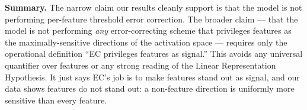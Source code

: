 \documentclass[11pt]{article}
\begin{document}
\medskip
\noindent\textbf{Summary.} The narrow claim our results cleanly support is that the model is not performing per-feature threshold error correction. The broader claim --- that the model is not performing \emph{any} error-correcting scheme that privileges features as the maximally-sensitive directions of the activation space --- requires only the operational definition ``EC privileges features as signal.'' This avoids any universal quantifier over features or any strong reading of the Linear Representation Hypothesis. It just says EC's job is to make features stand out as signal, and our data shows features do not stand out: a non-feature direction is uniformly more sensitive than every feature.
\end{document}
